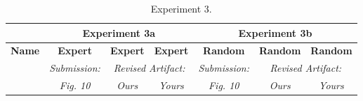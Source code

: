 \begin{table}

\experimentTableSize

\begin{tabular}{l|cccccc}
& \multicolumn{3}{c}{\textbf{Experiment 3a}}
& \multicolumn{3}{c}{\textbf{Experiment 3b}} \\\hline
\textbf{Name} &
\textbf{Expert} & \textbf{Expert} & \textbf{Expert} &
\textbf{Random} & \textbf{Random} & \textbf{Random} \\
&
\textit{Submission:} & \multicolumn{2}{c}{\textit{Revised Artifact:}} &
\textit{Submission:} & \multicolumn{2}{c}{\textit{Revised Artifact:}} \\
&
\textit{Fig. 10} & \textit{Ours} & \textit{Yours} &
\textit{Fig. 10} & \textit{Ours} & \textit{Yours} \\

\end{tabular}

\vspace{0.10in}

\caption{Experiment 3.}

\end{table}
